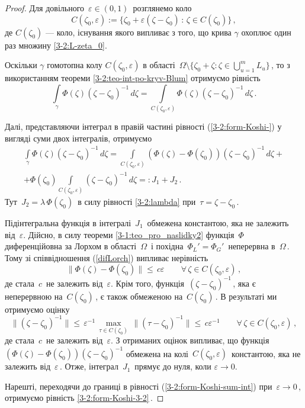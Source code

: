 \documentclass[11pt, reqno]{amsart}
\begin{document}
\begin{proof} 
Для довільного\, $\varepsilon\in(0,1)$\, розглянемо коло
\[C(\zeta_0,\varepsilon):=\{\zeta_0+\varepsilon(\zeta-\zeta_0)\, : \, \zeta\in C(\zeta_0)\}\,,\]
де $C(\zeta_0)$ --- коло, існування якого випливає з того, що крива  $\gamma$
охоплює один раз множину \eqref{3-2:L-zeta_0}.

Оскільки $\gamma$ гомотопна колу $C(\zeta_0,\varepsilon)$ в області\,
$\Omega\setminus\big\{\zeta_0+\zeta: \zeta\in\bigcup\limits_{u=1}^m L_u\big\}$\,, то
з використанням теореми \ref{3-2:teo-int-po-kryv-Blum} отримуємо рівність
   \begin{equation}\label{3-2:form-Koshi-}
\int\limits_{\gamma}\Phi(\zeta)\left(\zeta-\zeta_{0}\right)^{-1}\,d\zeta=
\int\limits_{C(\zeta_0,\varepsilon)}\Phi(\zeta)\left(\zeta-\zeta_{0}\right)^{-1}\,d\zeta\,.
\end{equation}

Далі, представляючи інтеграл в правій частині рівності
(\ref{3-2:form-Koshi-}) у вигляді суми двох інтегралів, отримуємо
\begin{multline}\label{3-2:form-Koshi-sum-int}
\int\limits_{\gamma}\Phi(\zeta)\left(\zeta-\zeta_{0}\right)^{-1}\,d\zeta=
\int\limits_{C(\zeta_0,\varepsilon)}(\Phi(\zeta)-\Phi(\zeta_{0}))\left(\zeta-\zeta_{0}\right)^{-1}\,d\zeta+\\
+\Phi(\zeta_{0})\int\limits_{C(\zeta_0,\varepsilon)}\left(\zeta-\zeta_{0}\right)^{-1}\,d\zeta=
:J_{1}+J_{2}\,.
\end{multline}
Тут\, $J_{2}=\lambda\,\Phi(\zeta_{0})$\, в силу рівності \eqref{3-2:lambda} при\, $\tau=\zeta-\zeta_0$\,.

Підінтегральна функція в інтегралі\, $J_1$\, обмежена константою, яка
не залежить від\, $\varepsilon$. Дійсно, в силу теореми \ref{3-1:teo_pro_naslidky2}
функція\, $\Phi$\, диференційовна за Лорхом в області\, $\Omega$\,
і похідна\, $\Phi_L'=\Phi_G'$\, неперервна в\, $\Omega$\,.
Тому зі співвідношення (\ref{difLorch}) випливає нерівність
\[\|\Phi(\zeta)-\Phi(\zeta_{0})\|\le \,c\varepsilon \qquad \forall\,\zeta\in C(\zeta_0,\varepsilon)\,,\]
де стала\, $c$\, не залежить від\, $\varepsilon$.
Крім того, функція\, $(\zeta-\zeta_{0})^{-1}$\,, яка є неперервною на\, $C(\zeta_0)$\,, є також обмеженою
на\, $C(\zeta_0)$\,. В результаті ми отримуємо оцінку
\[\|(\zeta-\zeta_{0})^{-1}\|\le \, \varepsilon^{-1}\, \max_{\tau\in C(\zeta_0)}\, \|(\tau-\zeta_{0})^{-1}\|
  \le\, c\varepsilon^{-1}  \qquad \forall\,\zeta\in C(\zeta_0,\varepsilon)\,,\]
де стала\, $c$\, не залежить від\, $\varepsilon$. З отриманих оцінок випливає, що функція
$(\Phi(\zeta)-\Phi(\zeta_{0}))(\zeta-\zeta_{0})^{-1}$ обмежена на колі\, $C(\zeta_0,\varepsilon)$\,
константою, яка не залежить від\, $\varepsilon$\,.
Отже, інтеграл\, $J_1$\, прямує до нуля, коли $\varepsilon\rightarrow0$.

Нарешті, переходячи до границі в рівності (\ref{3-2:form-Koshi-sum-int}) при\,
$\varepsilon\rightarrow 0$\,, отримуємо рівність \eqref{3-2:form-Koshi-3-2}\,.
\end{proof}
\end{document}
